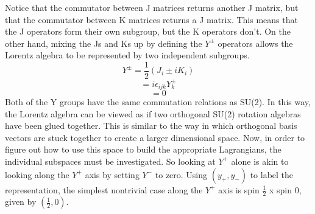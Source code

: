 Notice that the commutator between J matrices returns another J matrix, but that the commutator between K matrices returns a J matrix. This means that the J operators form their own subgroup, but the K operators don't. On the other hand, mixing the Js and Ks up by defining the $Y^{\pm}$ operators allows the Lorentz algebra to be represented by two independent subgroups. 
\begin{equation}
Y^{\pm} = \frac{1}{2}(J_i \pm iK_i)
\end{equation}
\begin{equation}
[Y^{\pm}_i, Y^{\pm}_j] = i\epsilon_{ijk}Y^{\pm}_k
\end{equation}
\begin{equation}
[Y^{\pm}_i, Y^{\mp}_j] = 0
\end{equation}
Both of the Y groups have the same commutation relations as SU(2). In this way, the Lorentz algebra can be viewed as if two orthogonal SU(2) rotation algebras have been glued together. This is similar to the way in which orthogonal basis vectors are stuck together to create a larger dimensional space. Now, in order to figure out how to use this space to build the appropriate Lagrangians, the individual subspaces must be investigated. So looking at $Y^{+}$ alone is akin to looking along the $Y^{+}$ axis by setting $Y^{-}$ to zero. Using $(y_+, y_-)$ to label the representation, the simplest nontrivial case along the $Y^{+}$ axis is spin $\frac{1}{2}$ x spin 0, given by $(\frac{1}{2}, 0)$.   

